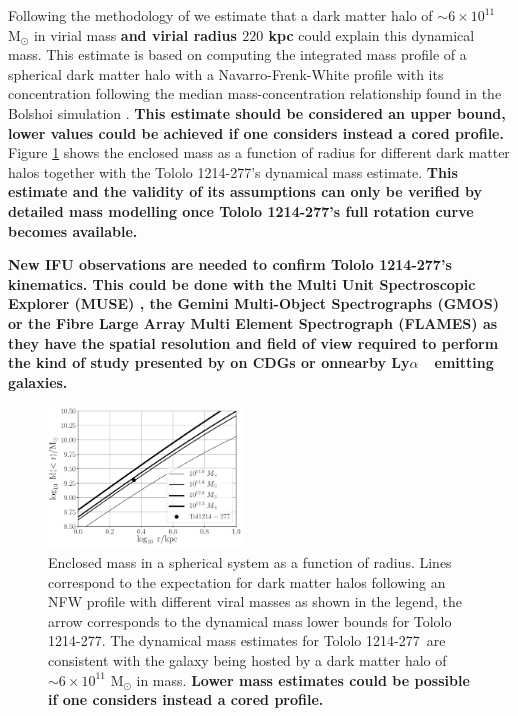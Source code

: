 \documentclass[a4paper,fleqn,usenatbib]{mnras}
\newcommand{\tol}{Tololo 1214-277}
\newcommand{\lya}{\ifmmode{{\rm Ly}\alpha}\else Ly$\alpha$\ \fi}
\begin{document}
Following the methodology of \citet{2011ApJ...726..108T} we estimate
that a dark matter halo of $\sim 6\times 10^{11}$ M$_{\odot}$ in
virial mass {\bf and virial radius $220$ kpc } could explain this dynamical mass.
This estimate is based on computing the integrated mass profile of a
spherical dark matter halo with a Navarro-Frenk-White profile with its
concentration following the median mass-concentration
relationship found in the Bolshoi simulation
\citep{2012MNRAS.423.3018P,2016ApJ...832..169P}.  
{\bf This estimate should be considered an upper bound, lower values
  could be achieved if one considers instead a cored profile.}
Figure \ref{fig:mass} shows the enclosed mass as a function of radius
for different dark matter halos together with the \tol's dynamical
mass estimate. 
{\bf This estimate and the validity of its assumptions can only be
  verified by detailed mass modelling once \tol's full rotation curve
  becomes available.}

{\bf New IFU observations are needed to confirm \tol's kinematics.
This could be done with the Multi Unit Spectroscopic Explorer (MUSE) 
\citep{2014Msngr.157...13B}, the Gemini Multi-Object Spectrographs (GMOS) 
\citep{2004PASP..116..425H} or the Fibre Large Array Multi Element
Spectrograph (FLAMES) \citep{2002Msngr.110....1P} as they have the spatial
resolution and field of view required to perform the kind of study
presented by \citet{2015A&A...577A..21C} on CDGs or \citet{Herenz16}
onnearby \lya\ emitting galaxies.}



\begin{figure}
\begin{center}
\includegraphics[width=0.46\textwidth]{enclosed_mass.pdf}
\caption{Enclosed mass in a spherical system as a function of radius.
  Lines correspond to the expectation for dark matter halos following
  an NFW profile with
  different viral masses as shown in the legend, the arrow corresponds
  to the dynamical mass lower bounds for \tol.  
  The dynamical mass estimates for \tol\ are consistent with the
  galaxy being hosted by a dark matter halo of
  $\sim 6\times10^{11}$ M$_{\odot}$ in mass.
  {\bf Lower mass estimates could be possible if one considers instead a
  cored profile. }
    \label{fig:mass}} 
\end{center}
\end{figure}
\end{document}
